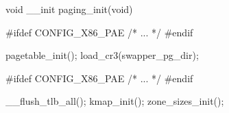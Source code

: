 \documentclass[varwidth=15.3em,crop]{standalone}
\begin{document}
\begin{ccode}
void __init paging_init(void)
{
#ifdef CONFIG_X86_PAE
  /* ... */
#endif
  
  pagetable_init();
  load_cr3(swapper_pg_dir);

#ifdef CONFIG_X86_PAE
  /* ... */
#endif

  __flush_tlb_all();
  kmap_init();
  zone_sizes_init();
}  
\end{ccode}
\end{document}
